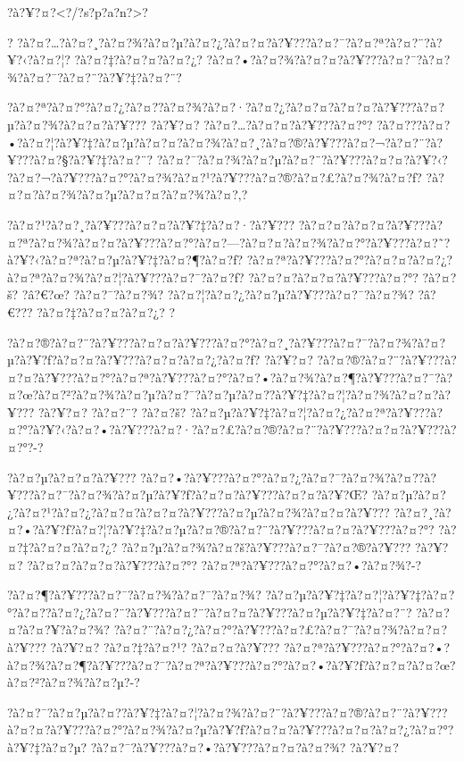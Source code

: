 \documentclass[11pt, openany]{book}
\begin{document}
{{{{{{{{{{{{{{?à?¥?¤?\textless{}?/?s?p?a?n?\textgreater{}?

?
?à?¤?\ldots{}?à?¤?¸?à?¤?¾?à?¤?µ?à?¤?¿?à?¤?¤?à?¥???à?¤?¯?à?¤?ª?à?¤?¨?à?¥?‹?à?¤?¦?
?à?¤?‡?à?¤?¤?à?¤?¿?
?à?¤?•?à?¤?¾?à?¤?¤?à?¥???à?¤?¯?à?¤?¾?à?¤?¯?à?¤?¨?à?¥?‡?à?¤?¨?

?à?¤?ª?à?¤?°?à?¤?¿?à?¤?­?à?¤?¾?à?¤?·?à?¤?¿?à?¤?¤?à?¤?¤?à?¥???à?¤?µ?à?¤?¾?à?¤?¤?à?¥???
?à?¥?¤? ?à?¤?\ldots{}?à?¤?¤?à?¥???à?¤?°?
?à?¤???à?¤?•?à?¤?¦?à?¥?‡?à?¤?µ?à?¤?¤?à?¤?¾?à?¤?¸?à?¤?®?à?¥???à?¤?¬?à?¤?¨?à?¥???à?¤?§?à?¥?‡?à?¤?¨?
?à?¤?¯?à?¤?¾?à?¤?µ?à?¤?¨?à?¥???à?¤?¤?à?¥?‹?
?à?¤?¬?à?¥???à?¤?°?à?¤?¾?à?¤?¹?à?¥???à?¤?®?à?¤?£?à?¤?¾?à?¤?ƒ?
?à?¤?¤?à?¤?¾?à?¤?µ?à?¤?¤?à?¤?¾?à?¤?‚?

?à?¤?¹?à?¤?¸?à?¥???à?¤?¤?à?¥?‡?à?¤?·?à?¥???
?à?¤?¤?à?¤?¤?à?¥???à?¤?ª?à?¤?¾?à?¤?¤?à?¥???à?¤?°?à?¤?---?à?¤?¤?à?¤?¾?à?¤?°?à?¥???à?¤?˜?à?¥?‹?à?¤?ª?à?¤?µ?à?¥?‡?à?¤?¶?à?¤?ƒ?
?à?¤?ª?à?¥???à?¤?°?à?¤?¤?à?¤?¿?à?¤?ª?à?¤?¾?à?¤?¦?à?¥???à?¤?¯?à?¤?ƒ?
?à?¤?¤?à?¤?¤?à?¥???à?¤?°? ?à?¤?š? ?â?€?œ? ?à?¤?¯?à?¤?¾?
?à?¤?¦?à?¤?¿?à?¤?µ?à?¥???à?¤?¯?à?¤?¾? ?â?€??? ?à?¤?‡?à?¤?¤?à?¤?¿? ?

?à?¤?®?à?¤?¨?à?¥???à?¤?¤?à?¥???à?¤?°?à?¤?¸?à?¥???à?¤?¯?à?¤?¾?à?¤?µ?à?¥?ƒ?à?¤?¤?à?¥???à?¤?¤?à?¤?¿?à?¤?ƒ?
?à?¥?¤?
?à?¤?®?à?¤?¨?à?¥???à?¤?¤?à?¥???à?¤?°?à?¤?ª?à?¥???à?¤?°?à?¤?•?à?¤?¾?à?¤?¶?à?¥???à?¤?¯?à?¤?œ?à?¤?²?à?¤?¾?à?¤?µ?à?¤?¯?à?¤?µ?à?¤?­?à?¥?‡?à?¤?¦?à?¤?¾?à?¤?¤?à?¥???
?à?¥?¤? ?à?¤?¨? ?à?¤?š?
?à?¤?µ?à?¥?‡?à?¤?¦?à?¤?¿?à?¤?ª?à?¥???à?¤?°?à?¥?‹?à?¤?•?à?¥???à?¤?·?à?¤?£?à?¤?®?à?¤?¨?à?¥???à?¤?¤?à?¥???à?¤?°?-?

?à?¤?µ?à?¤?¤?à?¥???
?à?¤?•?à?¥???à?¤?°?à?¤?¿?à?¤?¯?à?¤?¾?à?¤?­?à?¥???à?¤?¯?à?¤?¾?à?¤?µ?à?¥?ƒ?à?¤?¤?à?¥???à?¤?¤?à?¥?Œ?
?à?¤?µ?à?¤?¿?à?¤?¹?à?¤?¿?à?¤?¤?à?¤?¤?à?¥???à?¤?µ?à?¤?¾?à?¤?¤?à?¥???
?à?¤?¸?à?¤?•?à?¥?ƒ?à?¤?¦?à?¥?‡?à?¤?µ?à?¤?®?à?¤?¨?à?¥???à?¤?¤?à?¥???à?¤?°?
?à?¤?‡?à?¤?¤?à?¤?¿? ?à?¤?µ?à?¤?¾?à?¤?š?à?¥???à?¤?¯?à?¤?®?à?¥??? ?à?¥?¤?
?à?¤?¤?à?¤?¤?à?¥???à?¤?°? ?à?¤?ª?à?¥???à?¤?°?à?¤?•?à?¤?¾?-?

?à?¤?¶?à?¥???à?¤?¯?à?¤?¾?à?¤?¯?à?¤?¾?
?à?¤?µ?à?¥?‡?à?¤?¦?à?¥?‡?à?¤?°?à?¤?­?à?¤?¿?à?¤?¨?à?¥???à?¤?¨?à?¤?¤?à?¥???à?¤?µ?à?¥?‡?à?¤?¨?
?à?¤?¤?à?¤?¥?à?¤?¾?
?à?¤?¨?à?¤?¿?à?¤?°?à?¥???à?¤?£?à?¤?¯?à?¤?¾?à?¤?¤?à?¥??? ?à?¥?¤?
?à?¤?‡?à?¤?¹? ?à?¤?¤?à?¥???
?à?¤?ª?à?¥???à?¤?°?à?¤?•?à?¤?¾?à?¤?¶?à?¥???à?¤?¯?à?¤?ª?à?¥???à?¤?°?à?¤?•?à?¥?ƒ?à?¤?¤?à?¤?œ?à?¤?²?à?¤?¾?à?¤?µ?-?

?à?¤?¯?à?¤?µ?à?¤?­?à?¥?‡?à?¤?¦?à?¤?¾?à?¤?¨?à?¥???à?¤?®?à?¤?¨?à?¥???à?¤?¤?à?¥???à?¤?°?à?¤?¾?à?¤?µ?à?¥?ƒ?à?¤?¤?à?¥???à?¤?¤?à?¤?¿?à?¤?°?à?¥?‡?à?¤?µ?
?à?¤?¯?à?¥???à?¤?•?à?¥???à?¤?¤?à?¤?¾? ?à?¥?¤?

}}}}}}}}}}}}}}
\end{document}
